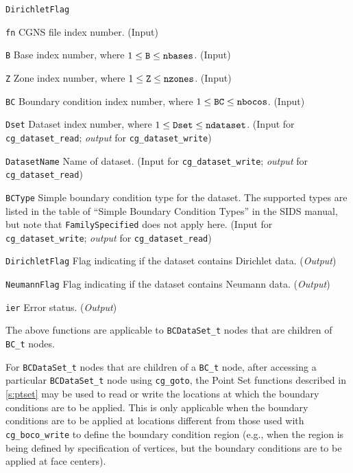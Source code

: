 \begin{Ventryi}{\texttt{DirichletFlag}}\raggedright
\item [\texttt{fn}]
      CGNS file index number.
      (\textcolor{input}{Input})
\item [\texttt{B}]
      Base index number, where $1 \leq \text{\texttt{B}} \leq \text{\texttt{nbases}}$.
      (\textcolor{input}{Input})
\item [\texttt{Z}]
      Zone index number, where $1 \leq \text{\texttt{Z}} \leq \text{\texttt{nzones}}$.
      (\textcolor{input}{Input})
\item [\texttt{BC}]
      Boundary condition index number, where $1 \leq \text{\texttt{BC}} \leq \text{\texttt{nbocos}}$.
      (\textcolor{input}{Input})
\item [\texttt{Dset}]
      Dataset index number, where $1 \leq \text{\texttt{Dset}} \leq \text{\texttt{ndataset}}$.
      (\textcolor{input}{Input} for \texttt{cg\_dataset\_read};
      \textcolor{output}{\textit{output}} for \texttt{cg\_dataset\_write})
\item [\texttt{DatasetName}]
      Name of dataset.
      (\textcolor{input}{Input} for \texttt{cg\_dataset\_write};
      \textcolor{output}{\textit{output}} for \texttt{cg\_dataset\_read})
\item [\texttt{BCType}]
      Simple boundary condition type for the dataset.
      The supported types are listed in the table of ``Simple
      Boundary Condition Types'' in the SIDS manual, but note that
      \texttt{FamilySpecified} does not apply here.
      (\textcolor{input}{Input} for \texttt{cg\_dataset\_write};
      \textcolor{output}{\textit{output}} for \texttt{cg\_dataset\_read})
\item [\texttt{DirichletFlag}]
      Flag indicating if the dataset contains Dirichlet data.
      (\textcolor{output}{\textit{Output}})
\item [\texttt{NeumannFlag}]
      Flag indicating if the dataset contains Neumann data.
      (\textcolor{output}{\textit{Output}})
\item [\texttt{ier}]
      Error status.
      (\textcolor{output}{\textit{Output}})
\end{Ventryi}

The above functions are applicable to \texttt{BCDataSet\_t} nodes
that are children of \texttt{BC\_t} nodes.

For \texttt{BCDataSet\_t} nodes that are children of a \texttt{BC\_t}
node, after accessing a particular \texttt{BCDataSet\_t} node using
\texttt{cg\_goto}, the Point Set functions described in \autoref{s:ptset}
may be used to read or write the locations at which the boundary
conditions are to be applied.
This is only applicable when the boundary conditions are to be applied
at locations different from those used with \texttt{cg\_boco\_write} to
define the boundary condition region (e.g., when the region is being
defined by specification of vertices, but the boundary conditions are to
be applied at face centers).

